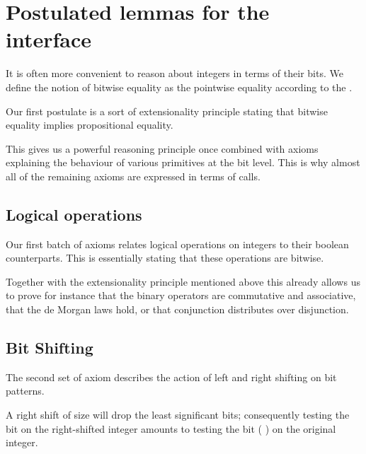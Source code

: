 \section{Postulated lemmas for the  interface}\label{appendix:postulated}

It is often more convenient to reason about integers in terms of their bits.
We define the notion of bitwise equality as the pointwise equality according
to the .


Our first postulate is a sort of extensionality principle stating that bitwise
equality implies propositional equality.


This gives us a powerful reasoning principle once combined with axioms
explaining the behaviour of various primitives at the bit level.
%
This is why almost all of the remaining axioms are expressed in terms
of  calls.

\subsection{Logical operations}

Our first batch of axioms relates logical operations on integers to their
boolean counterparts. This is essentially stating that these operations are
bitwise.


Together with the extensionality principle mentioned above this already
allows us to prove for instance that the binary operators are commutative
and associative, that the de Morgan laws hold, or that conjunction distributes
over disjunction.

\subsection{Bit Shifting}

The second set of axiom describes the action of left and right shifting on
bit patterns.

A right shift of size  will drop the  least
significant bits; consequently testing the bit  on the
right-shifted integer amounts to testing the bit
( \IdrisFunction{+} ) on the original integer.

